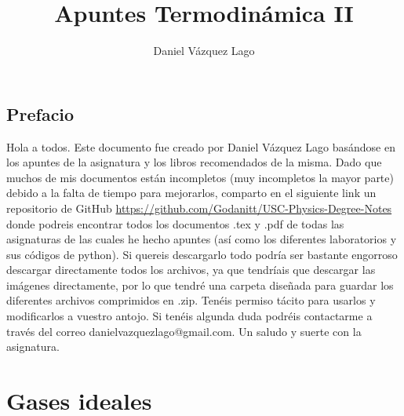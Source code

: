 \documentclass[12pt]{book}
\author{Daniel Vázquez Lago}
\title{Apuntes Termodinámica II}
\begin{document}
\newcommand{\parentesis}[1]{\left( #1  \right)}
\newcommand{\parciales}[2]{\frac{\partial #1}{\partial #2}}
\newcommand{\pparciales}[2]{\parentesis{\parciales{#1}{#2}}}
\newcommand{\D}{\mathrm{d}}
\newcommand{\corchetes}[1]{\left{ #1  \right} }
\newcommand{\ccorchetes}[1]{\left[ #1  \right]}
\newcommand{\cte}{\mathrm{cte}}
\newcommand{\tquad}{\quad \quad \quad}
\newcommand{\Jn}{\textbf{J}}
\newcommand{\Fn}{\textbf{F}}
\newcommand{\Omegan}{\mathbf{\Omega}}
\newcommand{\divergencia}{\nabla \cdot}
\newcommand{\rotacional}{\nabla \times}
\renewcommand{\div}{\nabla \cdot}
\newcommand{\logn}{\mathrm{ln} \ }
\newcommand{\rot}{\nabla \times}
\newcommand{\grad}{\nabla }
\newcommand{\inti}{\int_{-\infty}^{\infty}}
\newcommand{\into}{\int_{0}^{\infty}}
\newcommand{\muJK}{\mu_{JK}}


\maketitle

\newpage

\tableofcontents

\newpage


\section*{Prefacio}

Hola a todos. Este documento fue creado por Daniel Vázquez Lago basándose en los apuntes de la asignatura y los libros recomendados de la misma. Dado que muchos de mis documentos están incompletos (muy incompletos la mayor parte) debido a la falta de tiempo para mejorarlos, comparto en el siguiente link un repositorio de GitHub \url{https://github.com/Godanitt/USC-Physics-Degree-Notes} donde podreis encontrar todos los documentos .tex y .pdf de todas las asignaturas de las cuales he hecho apuntes (así como los diferentes laboratorios y sus códigos de python). Si quereis descargarlo todo podría ser bastante engorroso descargar directamente todos los archivos, ya que tendríais que descargar las imágenes directamente, por lo que tendré una carpeta diseñada para guardar los diferentes archivos comprimidos en .zip. Tenéis permiso tácito para usarlos y modificarlos a vuestro antojo. Si tenéis algunda duda podréis contactarme a través del correo danielvazquezlago@gmail.com. Un saludo y suerte con la asignatura.



\chapter{Gases ideales}
\end{document}
